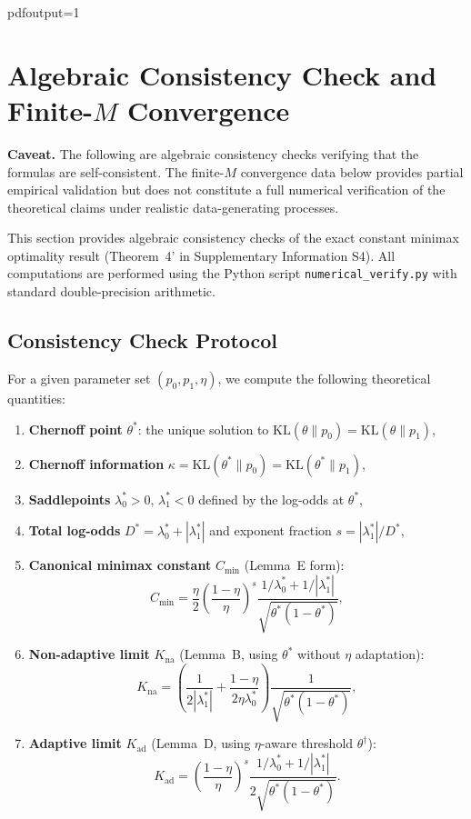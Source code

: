 pdfoutput=1
\section{Algebraic Consistency Check and Finite-$M$ Convergence}
\label{sec:numerical}

\textbf{Caveat.} The following are algebraic consistency checks verifying that the formulas are self-consistent. The finite-$M$ convergence data below provides partial empirical validation but does not constitute a full numerical verification of the theoretical claims under realistic data-generating processes.

This section provides algebraic consistency checks of the exact constant minimax optimality result (Theorem~4' in Supplementary Information S4). All computations are performed using the Python script \texttt{numerical\_verify.py} with standard double-precision arithmetic.

\subsection{Consistency Check Protocol}

For a given parameter set $(p_0, p_1, \eta)$, we compute the following theoretical quantities:

\begin{enumerate}
    \item \textbf{Chernoff point} $\theta^*$: the unique solution to $\mathrm{KL}(\theta\|p_0) = \mathrm{KL}(\theta\|p_1)$,
    \item \textbf{Chernoff information} $\kappa = \mathrm{KL}(\theta^*\|p_0) = \mathrm{KL}(\theta^*\|p_1)$,
    \item \textbf{Saddlepoints} $\lambda_0^* > 0$, $\lambda_1^* < 0$ defined by the log-odds at $\theta^*$,
    \item \textbf{Total log-odds} $D^* = \lambda_0^* + |\lambda_1^*|$ and exponent fraction $s = |\lambda_1^*|/D^*$,
    \item \textbf{Canonical minimax constant} $C_{\min}$ (Lemma~E form):
        \begin{equation}
        C_{\min} = \frac{\eta}{2} \left(\frac{1-\eta}{\eta}\right)^{s}
        \frac{1/\lambda_0^* + 1/|\lambda_1^*|}{\sqrt{\theta^*(1-\theta^*)}},
        \end{equation}
    \item \textbf{Non-adaptive limit} $K_{\mathrm{na}}$ (Lemma~B, using $\theta^*$ without $\eta$ adaptation):
        \begin{equation}
        K_{\mathrm{na}} = \left(\frac{1}{2|\lambda_1^*|} + \frac{1-\eta}{2\eta\lambda_0^*}\right) \frac{1}{\sqrt{\theta^*(1-\theta^*)}},
        \end{equation}
    \item \textbf{Adaptive limit} $K_{\mathrm{ad}}$ (Lemma~D, using $\eta$-aware threshold $\theta^\dagger$):
        \begin{equation}
        K_{\mathrm{ad}} = \left(\frac{1-\eta}{\eta}\right)^{s} \frac{1/\lambda_0^* + 1/|\lambda_1^*|}{2\sqrt{\theta^*(1-\theta^*)}}.
        \end{equation}
\end{enumerate}

